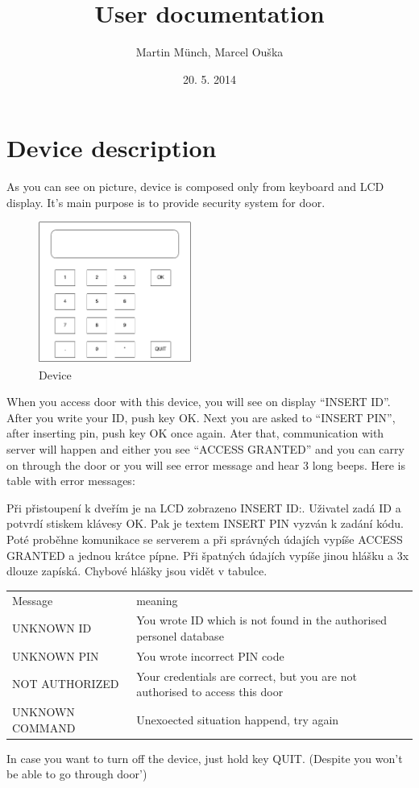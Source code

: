 \documentclass[11pt]{article}
\title{User documentation}
\author{Martin Münch, Marcel Ouška}
\date{20. 5. 2014}
\begin{document}
\maketitle

\section{Device description}
As you can see on picture, device is composed only from keyboard and LCD display. It's main purpose is to provide security system for door.

\begin{figure}[ht!]
\centering
\includegraphics[width=50mm]{apo}
\caption{Device}
\label{overflow}
\end{figure}

When you access door with this device, you will see on display ``INSERT ID''. After you write your ID, push key OK. Next you are asked to ``INSERT PIN'', after inserting pin, push key OK once again. Ater that, communication with server will happen and either you see ``ACCESS GRANTED'' and you can carry on through the door or you will see error message and hear 3 long beeps. Here is table with error messages: 

Při přistoupení k dveřím je na LCD zobrazeno INSERT ID:. Uživatel zadá ID a potvrdí stiskem klávesy OK. Pak je textem INSERT PIN vyzván k zadání kódu. Poté proběhne komunikace se serverem a při správných údajích vypíše ACCESS GRANTED a jednou krátce pípne. Při špatných údajích vypíše jinou hlášku a 3x dlouze zapíská. Chybové hlášky jsou vidět v tabulce. 

\begin{table}[h]
\begin{tabular}{ll}
Message             & meaning            \\ 
UNKNOWN ID      & You wrote ID which is not found in the authorised personel database     \\ 
UNKNOWN PIN     & You wrote incorrect PIN code       \\
NOT AUTHORIZED  & Your credentials are correct, but you are not authorised to access this door \\
UNKNOWN COMMAND &  Unexoected situation happend, try again
\end{tabular}
\end{table}

In case you want to turn off the device, just hold key QUIT. (Despite you won't be able to go through door')
\end{document}

